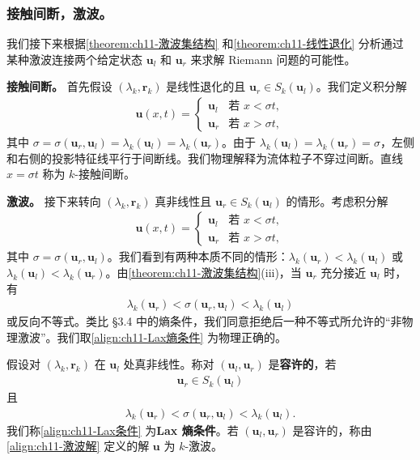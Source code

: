 \documentclass[../../main.tex]{subfiles}
\begin{document}
\subsubsection*{接触间断，激波。} 我们接下来根据\cref{theorem:ch11-激波集结构} 和\cref{theorem:ch11-线性退化} 分析通过某种激波连接两个给定状态 $\mathbf{u}_l$ 和 $\mathbf{u}_r$ 来求解 Riemann 问题的可能性。

\textbf{接触间断。} 首先假设 $(\lambda_k,\mathbf{r}_k)$ 是线性退化的且 $\mathbf{u}_r\in S_k(\mathbf{u}_l)$。我们定义积分解
\begin{align}
\mathbf{u}(x,t)=
\begin{cases}
\mathbf{u}_l & \text{若 } x<\sigma t,\\
\mathbf{u}_r & \text{若 } x>\sigma t,
\end{cases}
\label{align:ch11-接触间断解}
\end{align}
其中 $\sigma=\sigma(\mathbf{u}_r,\mathbf{u}_l)=\lambda_k(\mathbf{u}_l)=\lambda_k(\mathbf{u}_r)$。由于 $\lambda_k(\mathbf{u}_l)=\lambda_k(\mathbf{u}_r)=\sigma$，左侧和右侧的投影特征线平行于间断线。我们物理解释为流体粒子不穿过间断。直线 $x=\sigma t$ 称为 $k$-接触间断。

\textbf{激波。} 接下来转向 $(\lambda_k,\mathbf{r}_k)$ 真非线性且 $\mathbf{u}_r\in S_k(\mathbf{u}_l)$ 的情形。考虑积分解
\begin{align}
\mathbf{u}(x,t)=
\begin{cases}
\mathbf{u}_l & \text{若 } x<\sigma t,\\
\mathbf{u}_r & \text{若 } x>\sigma t,
\end{cases}
\label{align:ch11-激波解}
\end{align}
其中 $\sigma=\sigma(\mathbf{u}_r,\mathbf{u}_l)$。我们看到有两种本质不同的情形：$\lambda_k(\mathbf{u}_r)<\lambda_k(\mathbf{u}_l)$ 或 $\lambda_k(\mathbf{u}_l)<\lambda_k(\mathbf{u}_r)$。由\cref{theorem:ch11-激波集结构}(iii)，当 $\mathbf{u}_r$ 充分接近 $\mathbf{u}_l$ 时，有
\begin{align}
\lambda_k(\mathbf{u}_r)<\sigma(\mathbf{u}_r,\mathbf{u}_l)<\lambda_k(\mathbf{u}_l)
\label{align:ch11-Lax熵条件}
\end{align}
或反向不等式。类比 \S3.4 中的熵条件，我们同意拒绝后一种不等式所允许的``非物理激波''。我们取\eqref{align:ch11-Lax熵条件} 为物理正确的。

\begin{definition}\label{definition:ch11-Lax熵条件}
假设对 $(\lambda_k,\mathbf{r}_k)$ 在 $\mathbf{u}_l$ 处真非线性。称对 $(\mathbf{u}_l,\mathbf{u}_r)$ 是\textbf{容许的}，若
\begin{align*}
\mathbf{u}_r\in S_k(\mathbf{u}_l)
\end{align*}
且
\begin{align}
\lambda_k(\mathbf{u}_r)<\sigma(\mathbf{u}_r,\mathbf{u}_l)<\lambda_k(\mathbf{u}_l).
\label{align:ch11-Lax条件}
\end{align}
我们称\eqref{align:ch11-Lax条件} 为\textbf{Lax 熵条件}。若 $(\mathbf{u}_l,\mathbf{u}_r)$ 是容许的，称由\eqref{align:ch11-激波解} 定义的解 $\mathbf{u}$ 为 $k$-激波。
\end{definition}
\end{document}
